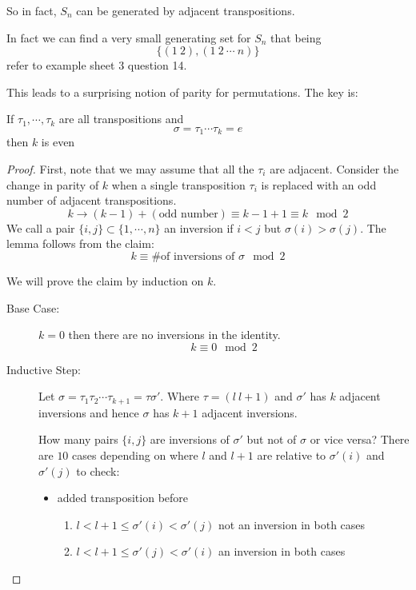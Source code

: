 \documentclass{article}
\begin{document}
So in fact, $S_n$ can be generated by adjacent transpositions.
\begin{remark}
    In fact we can find a very small generating set for $S_n$ that being
    \[
        \{(1\ 2), (1\ 2\ \cdots\ n)\}
    \]
    refer to example sheet 3 question 14.
\end{remark}
This leads to a surprising notion of parity for permutations. The key is:
\begin{lemma}
    If $\tau_1, \cdots, \tau_k$ are all transpositions and
    \[
        \sigma = \tau_1 \cdots \tau_k = e
    \]
    then $k$ is even
\end{lemma}
\begin{proof}
    First, note that we may assume that all the $\tau_i$ are adjacent. 
    Consider the change in parity of $k$ when a single transposition $\tau_i$ is replaced with an odd number of adjacent transpositions. 
    \[
        k \rightarrow (k - 1) + (\text{odd number}) \equiv k -1 + 1 \equiv k \mod 2  
    \]
    We call a pair $\{i, j\} \subset \{1, \cdots, n\}$ an inversion if $i < j$ but $\sigma(i) > \sigma(j)$.
    The lemma follows from the claim:
    \[
        k \equiv \text{\# of inversions of } \sigma \mod 2  
    \]


    We will prove the claim by induction on $k$.
    \begin{description}
        \item[Base Case: ] $k = 0$ then there are no inversions in the identity.
        \[
            k \equiv 0 \mod 2  
        \]
        \item[Inductive Step: ] Let $\sigma = \tau_1 \tau_2 \cdots \tau_{k+1} = \tau \sigma'$. 
        Where $\tau = (l\ l+1)$ and $\sigma'$ has $k$ adjacent inversions and hence $\sigma$ has $k+1$ adjacent inversions.
        
        How many pairs $\{i, j\}$ are inversions of $\sigma'$ but not of $\sigma$ or vice versa? There are $10$ cases depending on where $l$ and $l+1$ are relative to $\sigma'(i)$ and $\sigma'(j)$ to check:
        \begin{itemize}
            \item added transposition before
            \begin{enumerate}[label=(\arabic*)]
                \item $l < l + 1 \leq \sigma'(i) < \sigma'(j)$ not an inversion in both cases
                \item $l < l + 1 \leq \sigma'(j) < \sigma'(i)$ an inversion in both cases
            \end{enumerate}
            

\end{itemize}
\end{description}
\end{proof}
\end{document}
